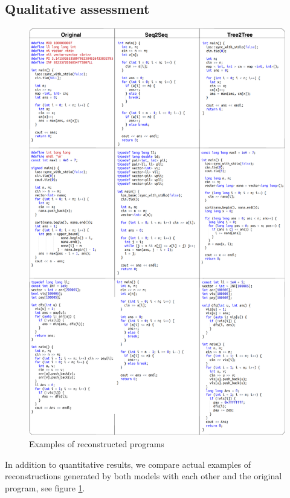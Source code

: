 \newpage
\subsection{Qualitative assessment}

\begin{figure}
  \centering
  \includegraphics[width=\textwidth,height=\textheight,keepaspectratio]{images/reconstruction_examples2.pdf}
  \caption{Examples of reconstructed programs}
  \label{fig:rec_examples}
\end{figure}

In addition to quantitative results, we compare actual examples of reconstructions generated by both models with each other and the original program, see figure \ref{fig:rec_examples}. 


